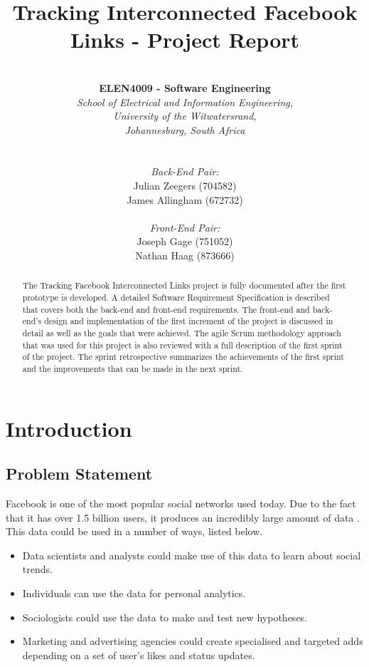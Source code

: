 \documentclass[12pt,onecolumn]{article}
\title{\huge Tracking Interconnected Facebook Links - Project Report}
\author{ \horrule{1pt} \\ \textbf{ELEN4009 - Software Engineering} \\ \emph{School of Electrical and Information Engineering,} \\ \emph{University of the Witwatersrand,} \\ \emph{Johannesburg, South Africa} \\ \horrule{1pt} \\\\ \emph{Back-End Pair:} \\ Julian Zeegers (704582) \\ James Allingham (672732) \\ \\ \emph{Front-End Pair:} \\ Joseph Gage (751052)\\ Nathan Haag (873666) \\ \horrule{1pt}}
\begin{document}
	
	\date{\vspace{-5ex}}
	\maketitle
	\pagestyle{plain}
	\thispagestyle{empty}
	
	\begin{abstract}
		The Tracking Facebook Interconnected Links project is fully documented after the first prototype is developed. A detailed Software Requirement Specification is described that covers both the back-end and front-end requirements. The front-end and back-end's design and implementation of the first increment of the project is discussed in detail as well as the goals that were achieved. The agile Scrum methodology approach that was used for this project is also reviewed with a full description of the first sprint of the project. The sprint retrospective summarizes the achievements of the first sprint and the improvements that can be made in the next sprint. 
	\end{abstract}
	
	\newpage
	
	\tableofcontents
	\listoffigures
	\listoftables
	\thispagestyle{empty}
	\setcounter{page}{0}
	
	\newpage
	
	\section{Introduction}
	
	\subsection{Problem Statement} %
	
	Facebook is one of the most popular social networks used today. Due to the fact that it has over 1.5 billion users, it produces an incredibly large amount of data \cite{fb}. This data could be used in a number of ways, listed below.
	
	\begin{itemize}
		\item Data scientists and analysts could make use of this data to learn about social trends.
		
		\item Individuals can use the data for personal analytics.
		
		\item Sociologists could use the data to make and test new hypotheses.
		
		\item Marketing and advertising agencies could create specialised and targeted adds depending on a set of user's likes and status updates.
		
	\end{itemize}    
	
\end{document}
